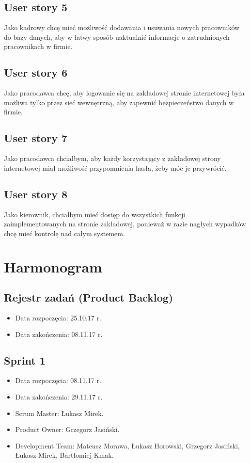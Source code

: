\documentclass[a4paper]{article}
\begin{document}
\subsection{User story 5}
Jako kadrowy chcę mieć możliwość dodawania i usuwania nowych pracowników do bazy danych, aby w łatwy sposób uaktualnić informacje o zatrudnionych pracownikach w firmie. 

\subsection{User story 6}
Jako pracodawca chcę, aby logowanie się na zakładowej stronie internetowej była możliwa tylko przez sieć wewnętrzną, aby zapewnić bezpieczeństwo danych w firmie.

\subsection{User story 7}
Jako pracodawca chciałbym, aby każdy korzystający z zakładowej strony internetowej miał możliwość przypomnienia hasła, żeby móc je przywrócić.

\subsection{User story 8}
Jako kierownik, chciałbym mieć dostęp do wszystkich funkcji zaimplementowanych na stronie zakładowej, ponieważ w razie nagłych wypadków chcę mieć kontrolę nad całym systemem.


\section{Harmonogram}

\subsection{Rejestr zadań (Product Backlog)}

\begin{itemize}
\item Data rozpoczęcia: 25.10.17 r.
\item Data zakończenia: 08.11.17 r.
\end{itemize}

\subsection{Sprint 1}

\begin{itemize}
\item Data rozpoczęcia: 08.11.17 r.
\item Data zakończenia: 29.11.17 r.
\item Scrum Master: Łukasz Mirek.
\item Product Owner: Grzegorz Jasiński.
\item Development Team: Mateusz Morawa, Łukasz Horowski, Grzegorz Jasiński, Łukasz Mirek, Bartłomiej Kmak.
\end{itemize}
\end{document}
